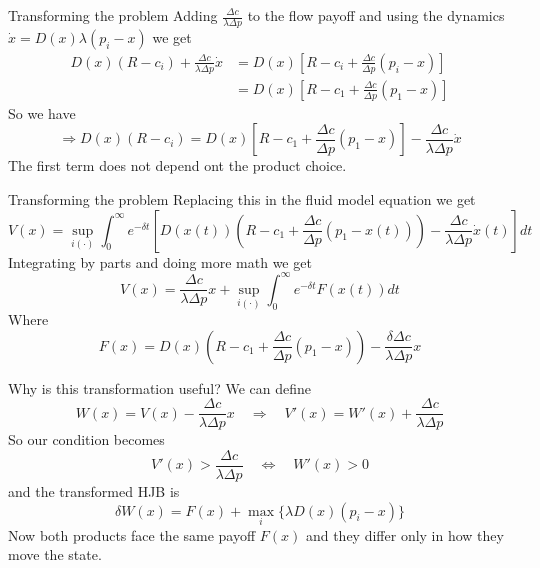 \documentclass[10pt]{beamer}
\begin{document}
\begin{frame}{Transforming the problem}
    Adding $\frac{\Delta c}{\lambda\Delta p}$ to the flow payoff and using the dynamics $\dot x = D(x)\lambda(p_i - x)$ we get
    \begin{align*}
        D(x)(R-c_i)+\frac{\Delta c}{\lambda\Delta p}\dot x
        &=D(x)\left[R-c_i+\frac{\Delta c}{\Delta p}(p_i-x)\right]\\
        &=D(x)\left[R-c_1+\frac{\Delta c}{\Delta p}(p_1-x)\right]
    \end{align*}
    So we have 
    \begin{equation*}
        \Rightarrow D(x)(R-c_i) =D(x)\left[R-c_1+\frac{\Delta c}{\Delta p}(p_1-x)\right] -\frac{\Delta c}{\lambda\Delta p}\dot x
    \end{equation*}
    The first term does not depend ont the product choice.
\end{frame}


\begin{frame}{Transforming the problem}
    Replacing this in the fluid model equation we get
    \begin{equation*}
        V(x) = \sup_{i(\cdot)} \int_{0}^{\infty} e^{-\delta t}\left[D(x(t))\left(R-c_1 + \frac{\Delta c}{\Delta p}(p_1-x(t))\right)-\frac{\Delta c}{\lambda\Delta p}\dot x(t)\right]dt
    \end{equation*} 
    Integrating by parts and doing more math we get
    \begin{equation}
        V(x) = \frac{\Delta c}{\lambda\Delta p} x + \sup_{i(\cdot)} \int_{0}^{\infty} e^{-\delta t} F(x(t))dt
    \end{equation} 
    Where 
    \begin{equation*}
        F(x) = D(x)\left(R-c_1 + \frac{\Delta c}{\Delta p}(p_1-x)\right)-\frac{\delta\Delta c}{\lambda\Delta p}x
    \end{equation*}
\end{frame}

\begin{frame}{Why is this transformation useful?}
    We can define 
    \begin{equation*}
        W(x) = V(x) - \frac{\Delta c}{\lambda \Delta p}x \quad \Rightarrow \quad V'(x) = W'(x) + \frac{\Delta c}{\lambda \Delta p}
    \end{equation*}
    \pause
    So our condition becomes
    \begin{equation*}
          V'(x) > \frac{\Delta c}{\lambda \Delta p} \quad \iff \quad W'(x) > 0
    \end{equation*}
    \pause
    and the transformed HJB is 
    \begin{equation}
        \delta W(x) = F(x) + \max_{i} \{ \lambda D(x)(p_i - x) \}
    \end{equation}
    \pause
    Now both products face the same payoff $F(x)$ and they differ only in how they move the state.
\end{frame}
\end{document}
